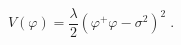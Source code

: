 \begin{equation}
V{(\varphi )=}\frac{\lambda }{2}\left( \varphi ^{+}\varphi -\sigma
^{2}\right) ^{2}\;.  \label{ps}
\end{equation}

